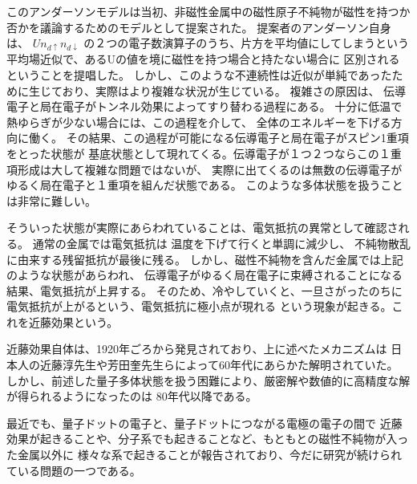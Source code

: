 \documentclass[letterpaper,10pt,dvipdfmx]{sphinxhowto}
\begin{document}
このアンダーソンモデルは当初、非磁性金属中の磁性原子不純物が磁性を持つか否かを議論するためのモデルとして提案された。
提案者のアンダーソン自身は、
\(Un_{d\uparrow}n_{d\downarrow}\)
の２つの電子数演算子のうち、片方を平均値にしてしまうという平均場近似で、あるUの値を境に磁性を持つ場合と持たない場合に
区別されるということを提唱した。
しかし、このような不連続性は近似が単純であったために生じており、実際はより複雑な状況が生じている。
複雑さの原因は、
伝導電子と局在電子がトンネル効果によってすり替わる過程にある。
十分に低温で熱ゆらぎが少ない場合には、この過程を介して、
全体のエネルギーを下げる方向に働く。
その結果、この過程が可能になる伝導電子と局在電子がスピン1重項をとった状態が
基底状態として現れてくる。伝導電子が１つ２つならこの１重項形成は大して複雑な問題ではないが、
実際に出てくるのは無数の伝導電子がゆるく局在電子と１重項を組んだ状態である。
このような多体状態を扱うことは非常に難しい。

そういった状態が実際にあらわれていることは、電気抵抗の異常として確認される。
通常の金属では電気抵抗は
温度を下げて行くと単調に減少し、
不純物散乱に由来する残留抵抗が最後に残る。
しかし、磁性不純物を含んだ金属では上記のような状態があらわれ、
伝導電子がゆるく局在電子に束縛されることになる結果、電気抵抗が上昇する。
そのため、冷やしていくと、一旦さがったのちに電気抵抗が上がるという、電気抵抗に極小点が現れる
という現象が起きる。これを近藤効果という。

近藤効果自体は、1920年ごろから発見されており、上に述べたメカニズムは
日本人の近藤淳先生や芳田奎先生らによって60年代にあらかた解明されていた。
しかし、前述した量子多体状態を扱う困難により、厳密解や数値的に高精度な解が得られるようになったのは
80年代以降である。

最近でも、量子ドットの電子と、量子ドットにつながる電極の電子の間で
近藤効果が起きることや、分子系でも起きることなど、もともとの磁性不純物が入った金属以外に
様々な系で起きることが報告されており、今だに研究が続けられている問題の一つである。
\end{document}
